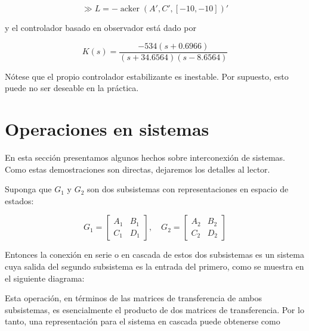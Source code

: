 $$
\gg L=-\operatorname{acker}\left(A', C',[-10,-10]\right)'
$$

y el controlador basado en observador está dado por

$$
K(s)=\frac{-534(s+0.6966)}{(s+34.6564)(s-8.6564)}
$$

Nótese que el propio controlador estabilizante es inestable. Por supuesto, esto puede no ser deseable en la práctica.

\section{Operaciones en sistemas}
En esta sección presentamos algunos hechos sobre interconexión de sistemas. Como estas demostraciones son directas, dejaremos los detalles al lector.

Suponga que $G_{1}$ y $G_{2}$ son dos subsistemas con representaciones en espacio de estados:

$$
G_{1}=\left[\begin{array}{c|c}
A_{1} & B_{1} \\
\hline C_{1} & D_{1}
\end{array}\right], \quad G_{2}=\left[\begin{array}{c|c}
A_{2} & B_{2} \\
\hline C_{2} & D_{2}
\end{array}\right]
$$

Entonces la conexión en serie o en cascada de estos dos subsistemas es un sistema cuya salida del segundo subsistema es la entrada del primero, como se muestra en el siguiente diagrama:


Esta operación, en términos de las matrices de transferencia de ambos subsistemas, es esencialmente el producto de dos matrices de transferencia. Por lo tanto, una representación para el sistema en cascada puede obtenerse como

